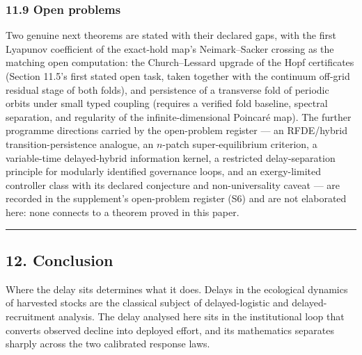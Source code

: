 \documentclass[11pt]{article}
\begin{document}
\subsubsection{11.9 Open problems}\label{open-problems}

Two genuine next theorems are stated with their declared gaps, with the
first Lyapunov coefficient of the exact-hold map's Neimark--Sacker
crossing as the matching open computation: the Church--Lessard upgrade
of the Hopf certificates (Section 11.5's first stated open task, taken
together with the continuum off-grid residual stage of both folds), and
persistence of a transverse fold of periodic orbits under small typed
coupling (requires a verified fold baseline, spectral separation, and
regularity of the infinite-dimensional Poincar\'e map). The further
programme directions carried by the open-problem register --- an
RFDE/hybrid transition-persistence analogue, an \(n\)-patch
super-equilibrium criterion, a variable-time delayed-hybrid information
kernel, a restricted delay-separation principle for modularly identified
governance loops, and an exergy-limited controller class with its
declared conjecture and non-universality caveat --- are recorded in the
supplement's open-problem register (S6) and are not elaborated here:
none connects to a theorem proved in this paper.

\begin{center}\rule{0.5\linewidth}{0.5pt}\end{center}

\subsection{12. Conclusion}\label{conclusion}

Where the delay sits determines what it does. Delays in the ecological
dynamics of harvested stocks are the classical subject of
delayed-logistic and delayed-recruitment analysis. The delay analysed
here sits in the institutional loop that converts observed decline into
deployed effort, and its mathematics separates sharply across the two
calibrated response laws.
\end{document}
